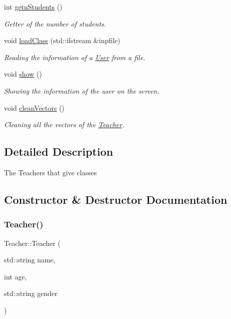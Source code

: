 \begin{DoxyCompactItemize}
int \mbox{\hyperlink{class_teacher_ae2e2666d5c8eceb29d6650d7b15958b1}{getn\+Students}} ()
\begin{DoxyCompactList}\small\item\em Getter of the number of students. \end{DoxyCompactList}\item 
void \mbox{\hyperlink{class_teacher_a1f204644af41c43ff3bd0582393062fa}{load\+Class}} (std\+::ifstream \&inpfile)
\begin{DoxyCompactList}\small\item\em Reading the information of a \mbox{\hyperlink{class_user}{User}} from a file. \end{DoxyCompactList}\item 
\mbox{\label{class_teacher_a3045744c4ef7e1189caac2ae9a126254}} 
void \mbox{\hyperlink{class_teacher_a3045744c4ef7e1189caac2ae9a126254}{show}} ()
\begin{DoxyCompactList}\small\item\em Showing the information of the user on the screen. \end{DoxyCompactList}\item 
\mbox{\label{class_teacher_ad8093070d9bf4c7663e4b7727576ab7a}} 
void \mbox{\hyperlink{class_teacher_ad8093070d9bf4c7663e4b7727576ab7a}{clean\+Vectors}} ()
\begin{DoxyCompactList}\small\item\em Cleaning all the vectors of the \mbox{\hyperlink{class_teacher}{Teacher}}. \end{DoxyCompactList}\end{DoxyCompactItemize}


\subsection{Detailed Description}
The Teachers that give classes 

\subsection{Constructor \& Destructor Documentation}
\mbox{\label{class_teacher_adb308468e6ed8bbbffaba9cbf1ae646e}} 
\subsubsection{\texorpdfstring{Teacher()}{Teacher()}}
{\footnotesize\ttfamily Teacher\+::\+Teacher (\begin{DoxyParamCaption}\item[{std\+::string}]{name,  }\item[{int}]{age,  }\item[{std\+::string}]{gender }\end{DoxyParamCaption})}



